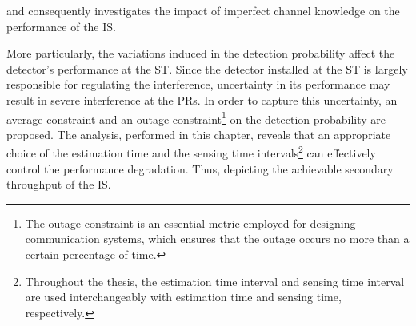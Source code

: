  and consequently investigates the impact of imperfect channel knowledge on the performance of the IS. 

More particularly, the variations induced in the detection probability affect the detector's performance at the ST. Since the detector installed at the ST is largely responsible for regulating the interference, uncertainty in its performance may result in severe interference at the PRs. In order to capture this uncertainty, an average constraint and an outage constraint\footnote{The outage constraint is an essential metric employed for designing communication systems, which ensures that the outage occurs no more than a certain percentage of time.} on the detection probability are proposed.
The analysis, performed in this chapter, reveals that an appropriate choice of the estimation time and the sensing time intervals\footnote{Throughout the thesis, the estimation time interval and sensing time interval are used interchangeably with estimation time and sensing time, respectively.} can effectively control the performance degradation. Thus, depicting the achievable secondary throughput of the IS.


